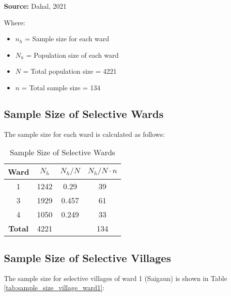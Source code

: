 \textbf{Source:} Dahal, 2021

Where:
\begin{itemize}
    \item $n_h$ = Sample size for each ward
    \item $N_h$ = Population size of each ward
    \item $N$ = Total population size = 4221
    \item $n$ = Total sample size = 134
\end{itemize}

\subsection{Sample Size of Selective Wards}

The sample size for each ward is calculated as follows:

\begin{table}[h]
\centering
\caption{Sample Size of Selective Wards}
\label{tab:sample_size_wards}
\begin{tabular}{|c|c|c|c|}
\hline
\textbf{Ward} & \textbf{$N_h$} & \textbf{$N_h / N$} & \textbf{$N_h / N \cdot n$} \\ \hline
1 & 1242 & 0.29 & 39 \\ \hline
3 & 1929 & 0.457 & 61 \\ \hline
4 & 1050 & 0.249 & 33 \\ \hline
\textbf{Total} & 4221 & & 134 \\ \hline
\end{tabular}
\end{table}

\subsection{Sample Size of Selective Villages}

The sample size for selective villages of ward 1 (Saigaun) is shown in Table \ref{tab:sample_size_village_ward1}:

\begin{table}[h]
\centering
\caption{Sample Size of Selective Village of Ward 1 (Saigaun)}
\label{tab:sample_size_village_ward1}
\end{table}

